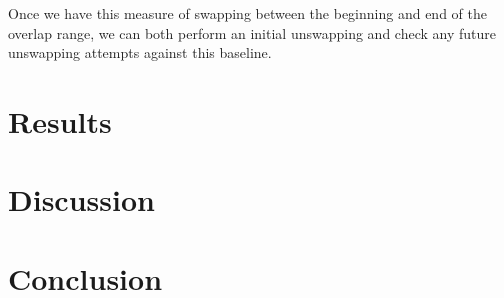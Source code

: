 \documentclass[12pt]{article}
\begin{document}
Once we have this measure of swapping between the beginning and end of the overlap range, we can both perform an initial unswapping and check any future unswapping attempts against this baseline.  

\section{Results}


\section{Discussion}


\section{Conclusion}
\end{document}
